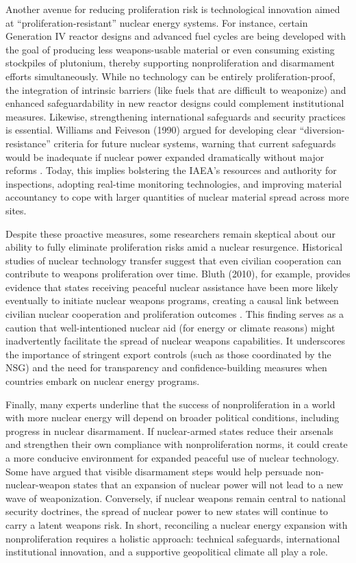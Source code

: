 \documentclass[11,5 pt]{article}
\begin{document}
Another avenue for reducing proliferation risk is technological innovation aimed at “proliferation-resistant” nuclear energy systems. For instance, certain Generation IV reactor designs and advanced fuel cycles are being developed with the goal of producing less weapons-usable material or even consuming existing stockpiles of plutonium, thereby supporting nonproliferation and disarmament efforts simultaneously. While no technology can be entirely proliferation-proof, the integration of intrinsic barriers (like fuels that are difficult to weaponize) and enhanced safeguardability in new reactor designs could complement institutional measures. Likewise, strengthening international safeguards and security practices is essential. Williams and Feiveson (1990) argued for developing clear “diversion-resistance” criteria for future nuclear systems, warning that current safeguards would be inadequate if nuclear power expanded dramatically without major reforms \cite{williams1990diversion}. Today, this implies bolstering the IAEA’s resources and authority for inspections, adopting real-time monitoring technologies, and improving material accountancy to cope with larger quantities of nuclear material spread across more sites.

Despite these proactive measures, some researchers remain skeptical about our ability to fully eliminate proliferation risks amid a nuclear resurgence. Historical studies of nuclear technology transfer suggest that even civilian cooperation can contribute to weapons proliferation over time. Bluth (2010), for example, provides evidence that states receiving peaceful nuclear assistance have been more likely eventually to initiate nuclear weapons programs, creating a causal link between civilian nuclear cooperation and proliferation outcomes \cite{10.2307/40784651}. This finding serves as a caution that well-intentioned nuclear aid (for energy or climate reasons) might inadvertently facilitate the spread of nuclear weapons capabilities. It underscores the importance of stringent export controls (such as those coordinated by the NSG) and the need for transparency and confidence-building measures when countries embark on nuclear energy programs.

Finally, many experts underline that the success of nonproliferation in a world with more nuclear energy will depend on broader political conditions, including progress in nuclear disarmament. If nuclear-armed states reduce their arsenals and strengthen their own compliance with nonproliferation norms, it could create a more conducive environment for expanded peaceful use of nuclear technology. Some have argued that visible disarmament steps would help persuade non-nuclear-weapon states that an expansion of nuclear power will not lead to a new wave of weaponization. Conversely, if nuclear weapons remain central to national security doctrines, the spread of nuclear power to new states will continue to carry a latent weapons risk. In short, reconciling a nuclear energy expansion with nonproliferation requires a holistic approach: technical safeguards, international institutional innovation, and a supportive geopolitical climate all play a role.
\end{document}
